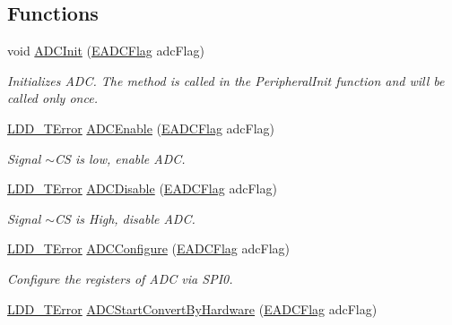 \subsection*{Functions}
\begin{DoxyCompactItemize}
\item 
void \hyperlink{group___a_d_c__module_ga0c711fb302e26085c0b47c83f53b263f}{A\-D\-C\-Init} (\hyperlink{group___enum_grp_ga7a77f876c6fae36cb97dfc3ba1e07665}{E\-A\-D\-C\-Flag} adc\-Flag)
\begin{DoxyCompactList}\small\item\em Initializes A\-D\-C. The method is called in the Peripheral\-Init function and will be called only once. \end{DoxyCompactList}\item 
\hyperlink{group___p_e___types__module_ga24c2b045fd04e79e85f261ce4df35588}{L\-D\-D\-\_\-\-T\-Error} \hyperlink{group___a_d_c__module_ga55fa03d1036f43603a3a0776e1068c8a}{A\-D\-C\-Enable} (\hyperlink{group___enum_grp_ga7a77f876c6fae36cb97dfc3ba1e07665}{E\-A\-D\-C\-Flag} adc\-Flag)
\begin{DoxyCompactList}\small\item\em Signal $\sim$\-C\-S is low, enable A\-D\-C. \end{DoxyCompactList}\item 
\hyperlink{group___p_e___types__module_ga24c2b045fd04e79e85f261ce4df35588}{L\-D\-D\-\_\-\-T\-Error} \hyperlink{group___a_d_c__module_gaee3c6f1b7638a7cf2ece62f97e507655}{A\-D\-C\-Disable} (\hyperlink{group___enum_grp_ga7a77f876c6fae36cb97dfc3ba1e07665}{E\-A\-D\-C\-Flag} adc\-Flag)
\begin{DoxyCompactList}\small\item\em Signal $\sim$\-C\-S is High, disable A\-D\-C. \end{DoxyCompactList}\item 
\hyperlink{group___p_e___types__module_ga24c2b045fd04e79e85f261ce4df35588}{L\-D\-D\-\_\-\-T\-Error} \hyperlink{group___a_d_c__module_ga2ec520f84e11f40a1d6e28004f143df5}{A\-D\-C\-Configure} (\hyperlink{group___enum_grp_ga7a77f876c6fae36cb97dfc3ba1e07665}{E\-A\-D\-C\-Flag} adc\-Flag)
\begin{DoxyCompactList}\small\item\em Configure the registers of A\-D\-C via S\-P\-I0. \end{DoxyCompactList}\item 
\hyperlink{group___p_e___types__module_ga24c2b045fd04e79e85f261ce4df35588}{L\-D\-D\-\_\-\-T\-Error} \hyperlink{group___a_d_c__module_ga3121ea29554dad5d44b0f93f44d4615a}{A\-D\-C\-Start\-Convert\-By\-Hardware} (\hyperlink{group___enum_grp_ga7a77f876c6fae36cb97dfc3ba1e07665}{E\-A\-D\-C\-Flag} adc\-Flag)

\end{DoxyCompactItemize}
